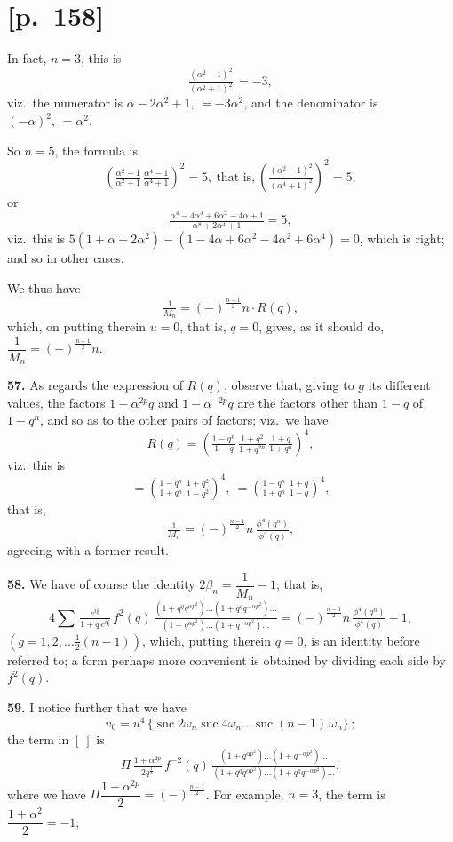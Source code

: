 \documentclass[11pt]{article}
\begin{document}
\section*{[p.~158]}
In fact, $n=3$, this is
\[
\tfrac{(\alpha^2-1)^2}{(\alpha^2+1)^2}\,=-3,
\]
viz.\ the numerator is $\alpha-2\alpha^2+1,\,=-3\alpha^2$, and the denominator is $(-\alpha)^2,\,=\alpha^2$.

So $n=5$, the formula is
\[
\!\left(\tfrac{\alpha^2-1}{\alpha^2+1}\,\tfrac{\alpha^4-1}{\alpha^4+1}\right)^{\!2}\!=5,\ \text{that is,}\ \!\left(\tfrac{(\alpha^2-1)^2}{(\alpha^4+1)^2}\right)^{\!2}\!=5,
\]
or
\[
\tfrac{\alpha^4-4\alpha^3+6\alpha^2-4\alpha+1}{\alpha^8+2\alpha^4+1}=5,
\]
viz.\ this is $5(1+\alpha+2\alpha^2)-(1-4\alpha+6\alpha^2-4\alpha^2+6\alpha^4)=0$, which is right; and so in other cases.

We thus have
\[
\tfrac{1}{M_n}=(-)^{\frac{n-1}{2}}n\cdot R(q),
\]
which, on putting therein $u=0$, that is, $q=0$, gives, as it should do, $\dfrac{1}{M_n}=(-)^{\frac{n-1}{2}}n$.

\medskip
\noindent\textbf{57.} As regards the expression of $R(q)$, observe that, giving to $g$ its different
values, the factors $1-\alpha^{2p}q$ and $1-\alpha^{-2p}q$ are the factors other than $1-q$ of $1-q^n$,
and so as to the other pairs of factors; viz.\ we have
\[
R(q)=\!\left(\tfrac{1-q^n}{1-q}\,\tfrac{1+q^2}{1+q^{2n}}\,\tfrac{1+q}{1+q^n}\right)^{\!4},
\]
viz.\ this is
\[
=\!\left(\tfrac{1-q^n}{1+q^n}\,\tfrac{1+q^2}{1-q^2}\right)^{\!4},\ =\!\left(\tfrac{1-q^n}{1+q^n}\,\tfrac{1+q}{1-q}\right)^{\!4},
\]
that is,
\[
\tfrac{1}{M_n}=(-)^{\frac{n-1}{2}}n\,\tfrac{\phi^4(q^n)}{\phi^4(q)},
\]
agreeing with a former result.

\medskip
\noindent\textbf{58.} We have of course the identity $2\beta_n=\dfrac{1}{M_n}-1$; that is,
\[
4\!\sum\,\tfrac{e^{i\xi}}{1+q\,e^{i\xi}}\,f^2(q)\,\tfrac{(1+q^{q}q^{\alpha p^2})\ldots(1+q^{q}q^{-\alpha p^2})\ldots}{(1+q^{\alpha p^2})\ldots(1+q^{-\alpha p^2})\ldots}=(-)^{\frac{n-1}{2}}n\,\tfrac{\phi^4(q^n)}{\phi^4(q)}-1,
\]
$(g=1, 2,\ldots\tfrac{1}{2}(n-1))$, which, putting therein $q=0$, is an identity before referred to; a
form perhaps more convenient is obtained by dividing each side by $f^2(q)$.

\medskip
\noindent\textbf{59.} I notice further that we have
\[
v_0=u^4\,\{\operatorname{snc}2\omega_n\operatorname{snc}4\omega_n\ldots\operatorname{snc}(n-1)\,\omega_n\}\,;
\]
the term in $[\ ]$ is
\[
\Pi\,\tfrac{1+\alpha^{2p}}{2q^{\frac{1}{4}}}\,f^{-2}(q)\,\tfrac{(1+q^{\alpha p^2})\ldots(1+q^{-\alpha p^2})\ldots}{(1+q^{q}q^{\alpha p^2})\ldots(1+q^{q}q^{-\alpha p^2})\ldots},
\]
where we have $\Pi\dfrac{1+\alpha^{2p}}{2}=(-)^{\frac{n-1}{2}}$. For example, $n=3$, the term is $\dfrac{1+\alpha^2}{2}=-1$;
\end{document}
